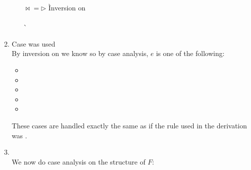 \begin{enumerate}
\begin{enumerate}
    \begin{tabbing}
    $\bowtie{} = \rhd$
     \` Inversion on  \\
     \\
      \`  \\
    \end{tabbing}

  \end{enumerate} %

\item Case  was used \ \\
  By inversion on  we know 
  so by case analysis, $e$ is one of the following:
  \begin{itemize}
  \item {}
  \item {}
  \item {}
  \item {}
  \item {}
  \end{itemize}

  These cases are handled exactly the same as if the rule used in the derivation was
  .

\item {} \ \\

  We now do case analysis on the structure of $F$:


\end{enumerate}
